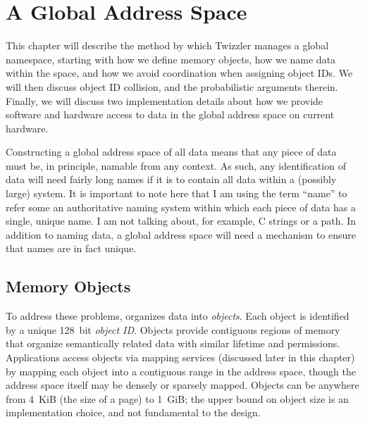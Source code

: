 
\chapter{A Global Address Space}\label{ch:global}

\begin{chabstract}
    This chapter will describe the method by which Twizzler manages a global namespace, starting with how we define
    memory objects, how we name data within the space, and how we avoid coordination when assigning object IDs. We will
    then discuss object ID collision, and the probabilistic arguments therein. Finally, we will discuss two
    implementation details about how we provide software and hardware access to data in the global address space on
    current hardware.
\end{chabstract}

Constructing a global address space of all data means that any piece of data must be, in principle, namable from any
context. As such, any identification of data will need fairly long names if it is to contain all data within a (possibly
large) system. It is important to note here that I am using the term ``name'' to refer some an authoritative naming
system within which each piece of data has a single, unique name. I am not talking about, for example, C strings or a
path. In addition to naming data, a global address space will need a mechanism to ensure that names are in fact unique.

\section{Memory Objects}
To address these problems, \Twizzler organizes data into \emph{objects}. Each object is
identified by a unique 128~bit \emph{object ID}.
Objects provide contiguous regions of memory that organize
semantically related data with similar lifetime and permissions.
Applications access objects via
mapping services (discussed later in this chapter) by mapping each object into a contiguous range
in the address space, though the address space itself may be densely or sparsely mapped.
Objects can be anywhere from 4~KiB (the size of a page) to 1~GiB; the upper bound on object size is
an implementation choice, and not fundamental to the design.

